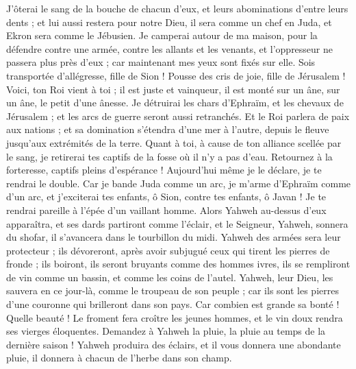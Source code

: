 \begin{multicols}{2}
J'ôterai le sang de la bouche de chacun d'eux, et leurs abominations d'entre leurs dents ; et lui aussi restera pour notre Dieu, il sera comme un chef en Juda, et Ekron sera comme le Jébusien.
Je camperai autour de ma maison, pour la défendre contre une armée, contre les allants et les venants, et l'oppresseur ne passera plus près d'eux ; car maintenant mes yeux sont fixés sur elle.
Sois transportée d'allégresse, fille de Sion ! Pousse des cris de joie, fille de Jérusalem ! Voici, ton Roi vient à toi ; il est juste et vainqueur, il est monté sur un âne, sur un âne, le petit d'une ânesse.
Je détruirai les chars d'Ephraïm, et les chevaux de Jérusalem ; et les arcs de guerre seront aussi retranchés. Et le Roi parlera de paix aux nations ; et sa domination s'étendra d'une mer à l'autre, depuis le fleuve jusqu'aux extrémités de la terre.
Quant à toi, à cause de ton alliance scellée par le sang, je retirerai tes captifs de la fosse où il n'y a pas d'eau.
Retournez à la forteresse, captifs pleins d'espérance ! Aujourd'hui même je le déclare, je te rendrai le double.
Car je bande Juda comme un arc, je m'arme d'Ephraïm comme d'un arc, et j'exciterai tes enfants, ô Sion, contre tes enfants, ô Javan ! Je te rendrai pareille à l'épée d'un vaillant homme.
Alors Yahweh au-dessus d'eux apparaîtra, et ses dards partiront comme l'éclair, et le Seigneur, Yahweh, sonnera du shofar, il s'avancera dans le tourbillon du midi.
Yahweh des armées sera leur protecteur ; ils dévoreront, après avoir subjugué ceux qui tirent les pierres de fronde ; ils boiront, ils seront bruyants comme des hommes ivres, ils se rempliront de vin comme un bassin, et comme les coins de l'autel.
Yahweh, leur Dieu, les sauvera en ce jour-là, comme le troupeau de son peuple ; car ils sont les pierres d'une couronne qui brilleront dans son pays.
Car combien est grande sa bonté ! Quelle beauté ! Le froment fera croître les jeunes hommes, et le vin doux rendra ses vierges éloquentes.
\VerseOne{}Demandez à Yahweh la pluie, la pluie au temps de la dernière saison ! Yahweh produira des éclairs, et il vous donnera une abondante pluie, il donnera à chacun de l'herbe dans son champ.

\end{multicols}

